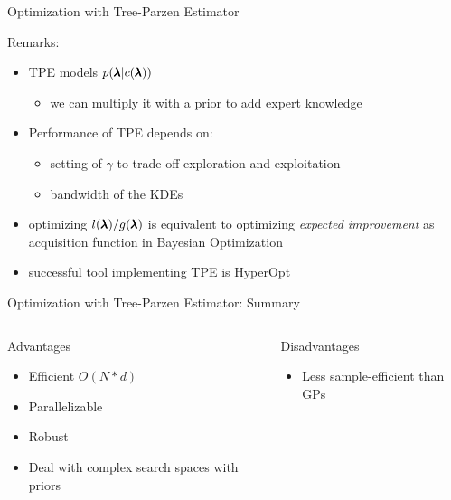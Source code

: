 \begin{frame}[c]{Optimization with Tree-Parzen Estimator}


Remarks:

\begin{itemize}
	\item TPE models $p(\pmb{\lambda} | c({\pmb{\lambda}}))$
	\begin{itemize}
		\item we can multiply it with a prior to add expert knowledge
	\end{itemize}
	\smallskip
	\pause
	\item Performance of TPE depends on:
	\begin{itemize}
		\item setting of $\gamma$ to trade-off exploration and exploitation
		\item bandwidth of the KDEs 
	\end{itemize}
	\pause
	\smallskip
	\item optimizing $l(\pmb{\lambda})/g(\pmb{\lambda})$ is equivalent to optimizing \emph{expected improvement} as acquisition function in Bayesian Optimization
	\pause
	\smallskip
	\item successful tool implementing TPE is HyperOpt
\end{itemize}

\end{frame}
\begin{frame}[c]{Optimization with Tree-Parzen Estimator: Summary}
\begin{columns}[T] %
\begin{column}{.48\textwidth}


    \begin{block}{Advantages}
    \begin{itemize}
    	\item Efficient $O(N*d)$
    	\pause
    	\item Parallelizable
    	\pause
    	\item Robust
    	\pause
    	\item Deal with complex search spaces with priors
    	\pause
    \end{itemize}
    \end{block}
\pause
\end{column}%

\hfill%

\begin{column}{.48\textwidth}

    \begin{block}{Disadvantages}
    \begin{itemize}
    	\item Less sample-efficient than GPs
    \end{itemize}
\end{block}

\end{column}
\end{columns}   

\end{frame}
